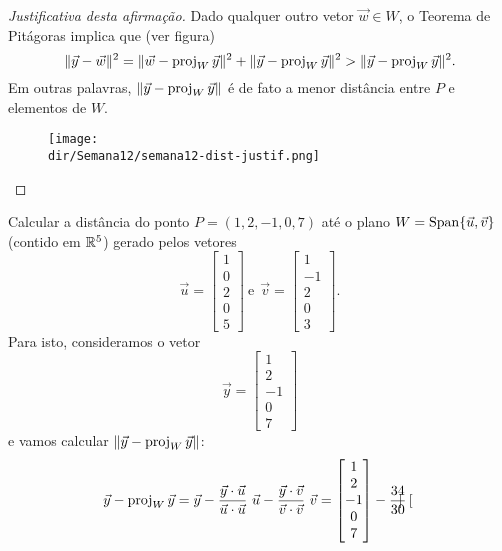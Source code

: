 \documentclass[../livro.tex]{subfiles}  %
\providecommand{\dir}{..}
\begin{document}
\begin{proof}[Justificativa desta afirmação]
Dado qualquer outro vetor $\vec{w} \in W$, o Teorema de Pitágoras implica que (ver figura)
\[
\| \vec{y} - \vec{w} \|^2 = \| \vec{w} - \operatorname{proj}_{W} \vec{y}\|^2 + \| \vec{y} - \operatorname{proj}_{W} \vec{y}\|^2 > \| \vec{y} - \operatorname{proj}_{W} \vec{y}\|^2.
\] Em outras palavras, $\|\vec{y} - \operatorname{proj}_{W} \vec{y}\|$ é de fato a menor distância entre $P$ e elementos de $W$.
\begin{figure}[h!]
\begin{center}
\texttt{[image: \\dir/Semana12/semana12-dist-justif.png]}
\end{center}
\end{figure}
\end{proof}


\begin{example}
Calcular a distância do ponto $P = (1,2,-1,0,7)$ até o plano $W = \operatorname{Span}\{\vec{u}, \vec{v}\}$ (contido em $\mathbb{R}^5$) gerado pelos vetores
\[
\vec{u} =
\begin{bmatrix}
1 \\ 0 \\ 2 \\ 0 \\ 5
\end{bmatrix} \ \text{e} \ \
\vec{v} = \begin{bmatrix}
1 \\ -1 \\ 2 \\ 0 \\ 3
\end{bmatrix}.
\] Para isto, consideramos o vetor
\[
\vec{y} = \begin{bmatrix}
1 \\ 2 \\ -1 \\ 0 \\ 7
\end{bmatrix}
\]e vamos calcular $\|\vec{y} - \operatorname{proj}_W \vec{y}\|$:
\[
\begin{split}
\vec{y} - \operatorname{proj}_W \vec{y} & = \vec{y} - \frac{\vec{y} \cdot \vec{u}}{\vec{u} \cdot \vec{u}} \ \vec{u} - \frac{\vec{y} \cdot \vec{v}}{\vec{v} \cdot \vec{v}} \ \vec{v}  =
\begin{bmatrix}
1 \\ 2 \\ -1 \\ 0 \\ 7
\end{bmatrix} - \frac{34}{30}
\begin{bmatrix}

\end{bmatrix}
\end{split}\]
\end{example}
\end{document}
